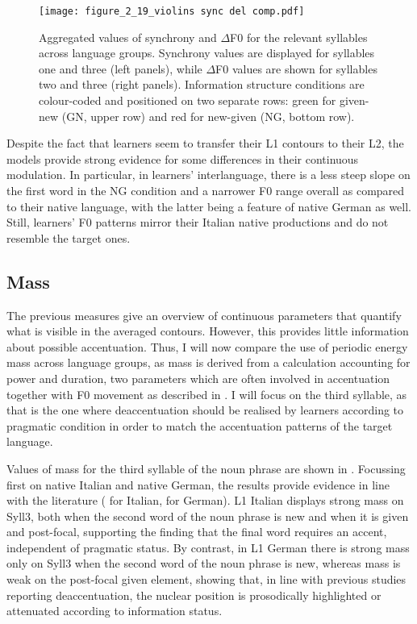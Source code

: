 \begin{figure}
\texttt{[image: figure\_2\_19\_violins sync del comp.pdf]}%
\caption{Aggregated values of synchrony and ${\Delta}$F0 for the relevant syllables across language groups. Synchrony values are displayed for syllables one and three (left panels), while ${\Delta}$F0 values are shown for syllables two and three (right panels). Information structure conditions are colour-coded and positioned on two separate rows: green for given-new (GN, upper row) and red for new-given (NG, bottom row).}
\label{fig:2.19}
\end{figure}

Despite the fact that learners seem to transfer their L1 contours to their L2, the models provide strong evidence for some differences in their continuous modulation. In particular, in learners’ interlanguage, there is a less steep slope on the first word in the NG condition and a narrower F0 range overall as compared to their native language, with the latter being a feature of native German as well. Still, learners’ F0 patterns mirror their Italian native productions and do not resemble the target ones.

\subsection{Mass}
\label{sec:2.7.2}
The previous measures give an overview of continuous parameters that quantify what is visible in the averaged contours. However, this provides little information about possible accentuation. Thus, I will now compare the use of periodic energy mass across language groups, as mass is derived from a calculation accounting for power and duration, two parameters which are often involved in accentuation together with F0 movement as described in . I will focus on the third syllable, as that is the one where deaccentuation should be realised by learners according to pragmatic condition in order to match the accentuation patterns of the target language.

Values of mass for the third syllable of the noun phrase are shown in . Focussing first on native Italian and native German, the results provide evidence in line with the literature ( for Italian,  for German). L1 Italian displays strong mass on Syll3, both when the second word of the noun phrase is new and when it is given and post-focal, supporting the finding that the final word requires an accent, independent of pragmatic status. By contrast, in L1 German there is strong mass only on Syll3 when the second word of the noun phrase is new, whereas mass is weak on the post-focal given element, showing that, in line with previous studies reporting deaccentuation, the nuclear position is prosodically highlighted or attenuated according to information status.

